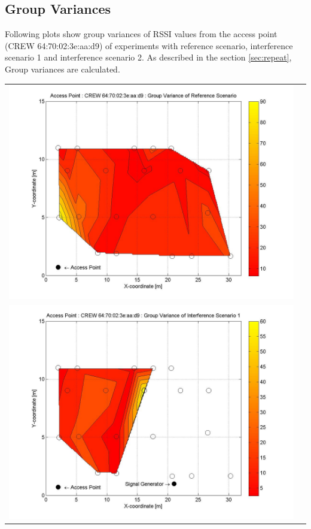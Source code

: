\documentclass[11pt,a4paper,headinclude,footinclude,chapterprefix=on]{scrreprt}
\begin{document}
\subsection{Group Variances} 
Following plots show group variances of RSSI values from the access point (CREW 64:70:02:3e:aa:d9) of experiments with reference scenario, interference scenario 1 and interference scenario 2. As described in the section \ref{sec:repeat}, Group variances are calculated.  
\begin{longtable}
	{lr} 
	\includegraphics[width=13cm]{../../Source/plot/CREW_d9/d9_Ref_Group_Variance.jpg} \\
	\includegraphics[width=13cm]{../../Source/plot/CREW_d9/d9_Sig_Group_Variance.jpg} \\

\end{longtable}
\end{document}
